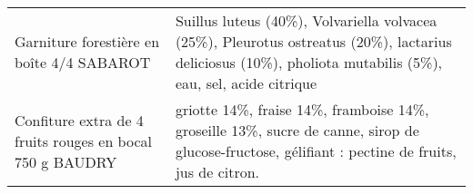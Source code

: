 \begin{longtable}{p{5cm}p{10cm}}
                                                                Garniture forestière en boîte 4/4 SABAROT &                                                                                                                                                                                                                                                                                                                                                                                                                                                                                                                                                                                                                                                                                                                                                                                                                                                                               Suillus luteus (40\%), Volvariella volvacea (25\%), Pleurotus ostreatus (20\%), lactarius deliciosus (10\%), pholiota mutabilis (5\%), eau, sel, acide citrique \\
                                                 Confiture extra de 4 fruits rouges en bocal 750 g BAUDRY &                                                                                                                                                                                                                                                                                                                                                                                                                                                                                                                                                                                                                                                                                                                                                                                                                                                                                          griotte 14\%, fraise 14\%, framboise 14\%, groseille 13\%, sucre de canne, sirop de glucose-fructose, gélifiant : pectine de fruits, jus de citron. \\

\end{longtable}
